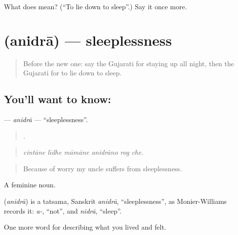 \begin{tcolorbox}[breakable,colback=teal!4,colframe=teal!35!black,title={Before you move on}]
What does  mean? (\textquotedblleft{}To lie down to sleep\textquotedblright{}.) Say it once more.
\end{tcolorbox}
\section[\texorpdfstring{\gu{અનિદ્રા} (anidrā)}{અનિદ્રા (anidrā)}]{ (anidrā) — sleeplessness}

\label{lesson:GU-C476-anidra}



\begin{quote}
Before the new one: say the Gujarati for staying up all night, then the Gujarati for to lie down to sleep.
\end{quote}

\subsection*{You'll want to know: }
\textbf{} — \emph{anidrā} — \textquotedblleft{}sleeplessness\textquotedblright{}.

\begin{quote}
     .
\end{quote}

\begin{quote}
\emph{cintāne līdhe māmāne anidrāno rog che.}
\end{quote}

\begin{quote}
Because of worry my uncle suffers from sleeplessness.
\end{quote}

A feminine noun.

\begin{cousinweb}
\textbf{} (\emph{anidrā}) is a tatsama, Sanskrit \emph{anidrā}, \textquotedblleft{}sleeplessness\textquotedblright{}, as Monier-Williams records it: \emph{a-}, \textquotedblleft{}not\textquotedblright{}, and \emph{nidrā}, \textquotedblleft{}sleep\textquotedblright{}.
\end{cousinweb}

\begin{grammarlens}[title={What you've built}]
One more word for describing what you lived and felt.
\end{grammarlens}

